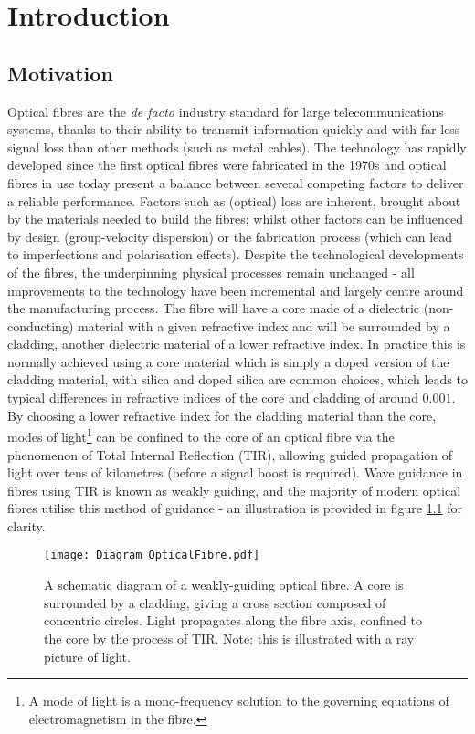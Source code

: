 \chapter{Introduction} \label{ch:Intro}

\section{Motivation} \label{sec:ProjectMotivation}
Optical fibres are the \textit{de facto} industry standard for large telecommunications systems, thanks to their ability to transmit information quickly and with far less signal loss than other methods (such as metal cables).
The technology has rapidly developed since the first optical fibres were fabricated in the 1970s \cite{knight2003photonic} and optical fibres in use today present a balance between several competing factors to deliver a reliable performance.
Factors such as (optical) loss are inherent, brought about by the materials needed to build the fibres; whilst other factors can be influenced by design (group-velocity dispersion) or the fabrication process (which can lead to imperfections and polarisation effects).
Despite the technological developments of the fibres, the underpinning physical processes remain unchanged - all improvements to the technology have been incremental and largely centre around the manufacturing process.
The fibre will have a core made of a dielectric (non-conducting) material with a given refractive index and will be surrounded by a cladding, another dielectric material of a lower refractive index.
In practice this is normally achieved using a core material which is simply a doped version of the cladding material, with silica and doped silica are common choices, which leads to typical differences in refractive indices of the core and cladding of around $0.001$.
By choosing a lower refractive index for the cladding material than the core, modes of light\footnote{A mode of light is a mono-frequency solution to the governing equations of electromagnetism in the fibre.} can be confined to the core of an optical fibre via the phenomenon of Total Internal Reflection (TIR), allowing guided propagation of light over tens of kilometres (before a signal boost is required).
Wave guidance in fibres using TIR is known as weakly guiding, and the majority of modern optical fibres utilise this method of guidance - an illustration is provided in figure \ref{fig:Diagram_OpticalFibre} for clarity. \newline
\begin{figure}[h]
	\centering
	\texttt{[image: Diagram\_OpticalFibre.pdf]}
	\caption{\label{fig:Diagram_OpticalFibre} A schematic diagram of a weakly-guiding optical fibre. A core is surrounded by a cladding, giving a cross section composed of concentric circles. Light propagates along the fibre axis, confined to the core by the process of TIR. Note: this is illustrated with a ray picture of light.}
\end{figure} 

